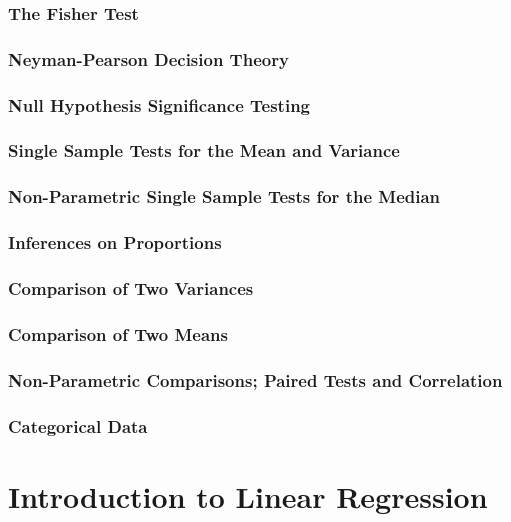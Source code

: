 \documentclass[11pt,a4paper]{article}
\begin{document}


\section{The Fisher Test}

\section{Neyman-Pearson Decision Theory}

\section{Null Hypothesis Significance Testing}
\section{Single Sample Tests for the Mean and Variance}
\section{Non-Parametric Single Sample Tests for the Median}
\section{Inferences on Proportions}
\section{Comparison of Two Variances}
\section{Comparison of Two Means}
\section{Non-Parametric Comparisons; Paired Tests and Correlation}
\section{Categorical Data}


\newpage
\part{Introduction to Linear Regression}
\end{document}
